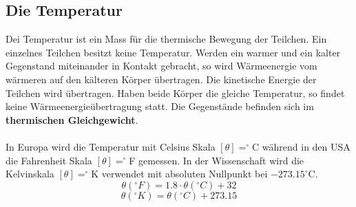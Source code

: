 \subsection{Die Temperatur}
Dei Temperatur ist ein Mass für die thermische Bewegung der Teilchen. Ein einzelnes Teilchen besitzt keine Temperatur. Werden ein warmer und ein kalter Gegenstand miteinander in Kontakt gebracht, so wird Wärmeenergie vom wärmeren auf den kälteren Körper übertragen. Die kinetische Energie der Teilchen wird übertragen. Haben beide Körper die gleiche Temperatur, so findet keine Wärmeenergieübertragung statt. Die Gegenstände befinden sich im \textbf{thermischen Gleichgewicht}.
\\\\
In Europa wird die Temperatur mit Celsius Skala $[\theta]=^{\circ}$C während in den USA die Fahrenheit Skala $[\theta]=^{\circ}$F gemessen. In der Wissenschaft wird die Kelvinskala $[\theta]=^{\circ}$K verwendet mit absoluten Nullpunkt bei $-273.15^{\circ}$C. 
\begin{equation}
\boxed{\theta(^{\circ}F)=1.8\cdot \theta(^{\circ}C)+32}
\end{equation}
\begin{equation}
\boxed{\theta(^{\circ}K)=\theta(^{\circ}C)+273.15}
\end{equation}
